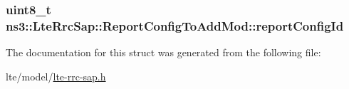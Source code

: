 \subsubsection[{\texorpdfstring{report\+Config\+Id}{reportConfigId}}]{\setlength{\rightskip}{0pt plus 5cm}uint8\+\_\+t ns3\+::\+Lte\+Rrc\+Sap\+::\+Report\+Config\+To\+Add\+Mod\+::report\+Config\+Id}\hypertarget{structns3_1_1LteRrcSap_1_1ReportConfigToAddMod_a07f0037bf344c284be4506a0b90998b2}{}\label{structns3_1_1LteRrcSap_1_1ReportConfigToAddMod_a07f0037bf344c284be4506a0b90998b2}


The documentation for this struct was generated from the following file\+:\begin{DoxyCompactItemize}
\item 
lte/model/\hyperlink{lte-rrc-sap_8h}{lte-\/rrc-\/sap.\+h}\end{DoxyCompactItemize}
